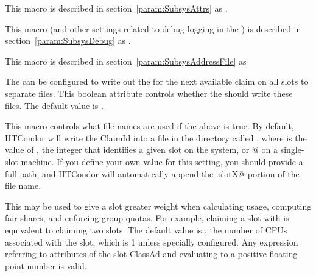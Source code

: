 \begin{description}
\label{param:StartdAttrs}
\item[\Macro{STARTD\_ATTRS}]
  This macro is described in section~\ref{param:SubsysAttrs} as
  .

\label{param:StartdDebug}
\item[\Macro{STARTD\_DEBUG}]
  This macro
  (and other settings related to debug logging in the ) is
  described in section~\ref{param:SubsysDebug} as
  .

\label{param:StartdAddressFile}
\item[\Macro{STARTD\_ADDRESS\_FILE}]
  This macro is described in section~\ref{param:SubsysAddressFile} as

\label{param:StartdShouldWriteClaimIdFile}
\item[\Macro{STARTD\_SHOULD\_WRITE\_CLAIM\_ID\_FILE}]
  The  can be configured
  to write out the  for the next available claim on all
  slots to separate files.
  This boolean attribute controls whether the  should
  write these files.
  The default value is .
  
\label{param:StartdClaimIdFile}
\item[\Macro{STARTD\_CLAIM\_ID\_FILE}]
  This macro controls what file names are used if the above
   is true.  By
  default, HTCondor will write the ClaimId into a file in the
   directory called , where
  \verb@X@ is the value of , the integer that
  identifies a given slot on the system, or @ on a
  single-slot machine.
  If you define your own value for this setting, you should provide a
  full path, and HTCondor will automatically append the \verb@.slotX@
  portion of the file name.

\label{param:SlotWeight}
\item[\Macro{SlotWeight}]
  This may be used to give a slot greater weight when
  calculating usage, computing fair shares, and enforcing group
  quotas.  For example, claiming a slot with  is
  equivalent to claiming two  slots.  The default
  value is , the number of CPUs associated with the slot,
  which is 1 unless specially configured.  Any expression referring to
  attributes of the slot ClassAd and evaluating to a positive floating
  point number is valid.


\end{description}
